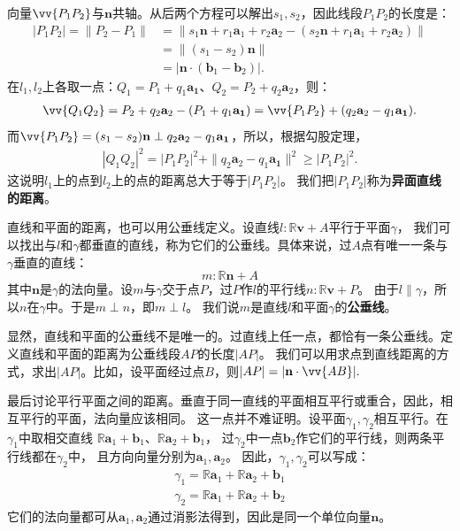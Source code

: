\documentclass[12pt,UTF8,fontset=none]{ctexbook}
\begin{document}
向量$\vv{P_1P_2}$与$\mathbf{n}$共轴。从后两个方程可以解出$s_1,s_2$，因此线段$P_1P_2$的长度是：
\begin{align*}
    |P_1P_2| = \|P_2 - P_1\| &= \|s_1\mathbf{n} + r_1\mathbf{a}_1 + r_2\mathbf{a}_2 - (s_2\mathbf{n} + r_1\mathbf{a}_1 + r_2\mathbf{a}_2)\|  \\
    &= \| (s_1 - s_2)\mathbf{n} \|  \\
    &= |\mathbf{n}\cdot(\mathbf{b}_1 - \mathbf{b}_2)|. 
\end{align*}
在$l_1,l_2$上各取一点：$Q_1 = P_1 + q_1\mathbf{a_1}$、$Q_2 = P_2 + q_2\mathbf{a}_2$，则：
\begin{align*}
    \vv{Q_1Q_2} = P_2 + q_2\mathbf{a}_2 - (P_1 + q_1\mathbf{a_1}) = \vv{P_1P_2}  + (q_2\mathbf{a}_2 - q_1\mathbf{a_1}).  
\end{align*}
而$\vv{P_1P_2} = (s_1 - s_2)\mathbf{n} \perp q_2\mathbf{a}_2 - q_1\mathbf{a_1}$，所以，根据勾股定理，
\begin{align*}
    |Q_1Q_2|^2 = |P_1P_2|^2 + \|q_2\mathbf{a}_2 - q_1\mathbf{a_1}\|^2 \geqslant |P_1P_2|^2.  
\end{align*}
这说明$l_1$上的点到$l_2$上的点的距离总大于等于$|P_1P_2|$。
我们把$|P_1P_2|$称为\textbf{异面直线的距离}。

直线和平面的距离，也可以用公垂线定义。设直线$l:\mathbb{R}\mathbf{v} + A$平行于平面$\gamma$，
我们可以找出与$l$和$\gamma$都垂直的直线，称为它们的公垂线。具体来说，过$A$点有唯一一条与$\gamma$垂直的直线：
$$ m:\mathbb{R}\mathbf{n} + A $$
其中$\mathbf{n}$是$\gamma$的法向量。设$m$与$\gamma$交于点$P$，过$P$作$l$的平行线$n:\mathbb{R}\mathbf{v} + P$。
由于$l\parallel\gamma$，所以$n$在$\gamma$中。于是$m\perp n$，即$m\perp l$。
我们说$m$是直线$l$和平面$\gamma$的\textbf{公垂线}。

显然，直线和平面的公垂线不是唯一的。过直线上任一点，都恰有一条公垂线。定义直线和平面的距离为公垂线段$AP$的长度$|AP|$。
我们可以用求点到直线距离的方式，求出$|AP|$。比如，设平面经过点$B$，则$|AP| = |\mathbf{n}\cdot \vv{AB}|.$

最后讨论平行平面之间的距离。垂直于同一直线的平面相互平行或重合，因此，相互平行的平面，法向量应该相同。
这一点并不难证明。设平面$\gamma_1,\gamma_2$相互平行。在$\gamma_1$中取相交直线
$\mathbb{R}\mathbf{a}_1 + \mathbf{b}_1$、$\mathbb{R}\mathbf{a}_2 + \mathbf{b}_1$，
过$\gamma_2$中一点$\mathbf{b}_2$作它们的平行线，则两条平行线都在$\gamma_2$中，
且方向向量分别为$\mathbf{a}_1,\mathbf{a}_2$。
因此，$\gamma_1,\gamma_2$可以写成：
\begin{align*}
    \gamma_1 = \mathbb{R}\mathbf{a}_1 + \mathbb{R}\mathbf{a}_2 + \mathbf{b}_1  \\
    \gamma_2 = \mathbb{R}\mathbf{a}_1 + \mathbb{R}\mathbf{a}_2 + \mathbf{b}_2 
\end{align*}
它们的法向量都可从$\mathbf{a}_1,\mathbf{a}_2$通过消影法得到，因此是同一个单位向量$\mathbf{n}$。
\end{document}
